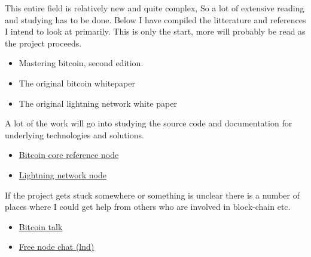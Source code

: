 This entire field is relatively new and quite complex, So a lot of extensive reading and studying has to be done. Below I have compiled the litterature and references I intend to look at primarily. This is only the start, more will probably be read as the project proceeds. 

\begin{itemize}
\item Mastering bitcoin, second edition.\cite{antonopoulos_2017}
\item The original bitcoin whitepaper\cite{nakamoto2012bitcoin}
\item The original lightning network white paper\cite{poon_dryja_2016}
\end{itemize}

A lot of the work will go into studying the source code and documentation for underlying technologies and solutions. 
\begin{itemize}
	\item \href{https://github.com/bitcoin/bitcoin}{Bitcoin core reference node}
	\item \href{https://github.com/lightningnetwork/lnd}{Lightning network node}
\end{itemize}

If the project gets stuck somewhere or something is unclear there is a number of places where I could get help from others who are involved in block-chain etc.

\begin{itemize}
	\item \href{https://bitcointalk.org/}{Bitcoin talk}
	\item \href{https://webchat.freenode.net/?channels=lnd}{Free node chat (lnd)}
\end{itemize}